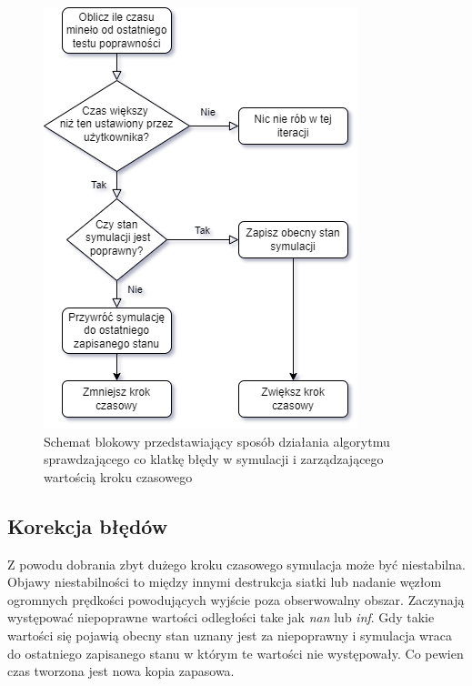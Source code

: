 \documentclass[12pt, letterpaper]{report}
\begin{document}
    \clearpage
    \begin{figure}
        \includegraphics[width=0.95\linewidth]{error_correction.drawio.png}
        \caption{
            Schemat blokowy przedstawiający sposób działania
            algorytmu sprawdzającego co klatkę
            błędy w symulacji i zarządzającego wartością kroku czasowego
        }
        \label{fig:error_correction}
    \end{figure}

    \subsection{Korekcja błędów}
    \label{subsec:error_correction}
    Z powodu dobrania zbyt dużego kroku czasowego symulacja może być niestabilna.
    Objawy niestabilności to między innymi destrukcja siatki lub nadanie węzłom 
    ogromnych prędkości powodujących wyjście poza obserwowalny obszar.
    Zaczynają występować niepoprawne wartości odległości take jak \emph{nan} lub \emph{inf}.
    Gdy takie wartości się pojawią obecny stan uznany jest za niepoprawny i 
    symulacja wraca do ostatniego zapisanego stanu w którym 
    te wartości nie występowały. Co pewien czas tworzona jest nowa kopia zapasowa. \\
\end{document}
